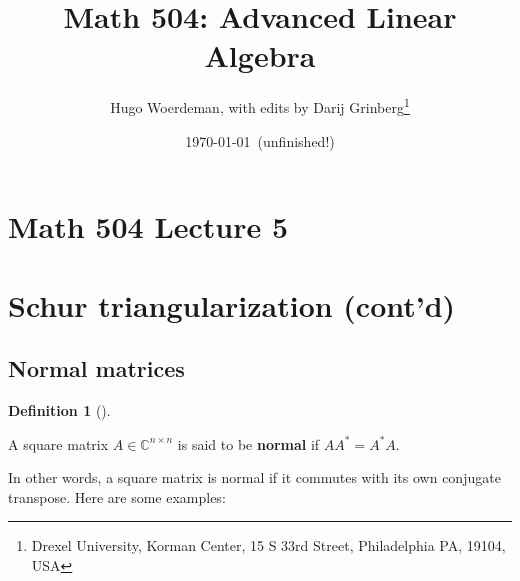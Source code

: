 \documentclass[numbers=enddot,12pt,final,onecolumn,notitlepage]{scrartcl}%
\numberwithin{exer}{subsection}
\theoremstyle{definition}
\newtheorem{defi}[theo]{Definition}
\newenvironment{definition}[1][]
{\begin{defi}[#1]\begin{leftbar}}
{\end{leftbar}\end{defi}}
\begin{document}
\title{Math 504: Advanced Linear Algebra}
\author{Hugo Woerdeman, with edits by Darij Grinberg\thanks{Drexel University, Korman
Center, 15 S 33rd Street, Philadelphia PA, 19104, USA}}
\date{\today\ (unfinished!)}
\maketitle
\tableofcontents

\section*{Math 504 Lecture 5}

\section{Schur triangularization (cont'd)}

\subsection{Normal matrices}

\begin{definition}
A square matrix $A\in\mathbb{C}^{n\times n}$ is said to be \textbf{normal} if
$AA^{\ast}=A^{\ast}A$.
\end{definition}

In other words, a square matrix is normal if it commutes with its own
conjugate transpose. Here are some examples:
\end{document}
